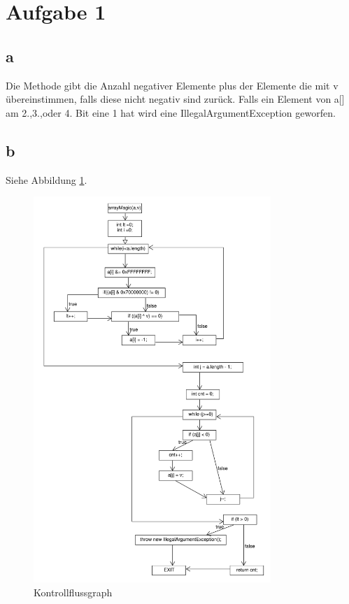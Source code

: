 \chapter*{Aufgabe 1}
\section*{a}
Die Methode gibt die Anzahl negativer Elemente plus der Elemente die mit v übereinstimmen, falls diese nicht negativ sind zurück. Falls ein Element von a[] am 2.,3.,oder 4. Bit eine 1 hat wird eine IllegalArgumentException geworfen.

\section*{b}
Siehe Abbildung \ref{fig:flowChart}.
\begin{figure}[h]
	\centering
	\includegraphics[width=0.8\textwidth, clip]{FlowChart.pdf}
	\caption{Kontrollflussgraph}
	\label{fig:flowChart}
\end{figure}
